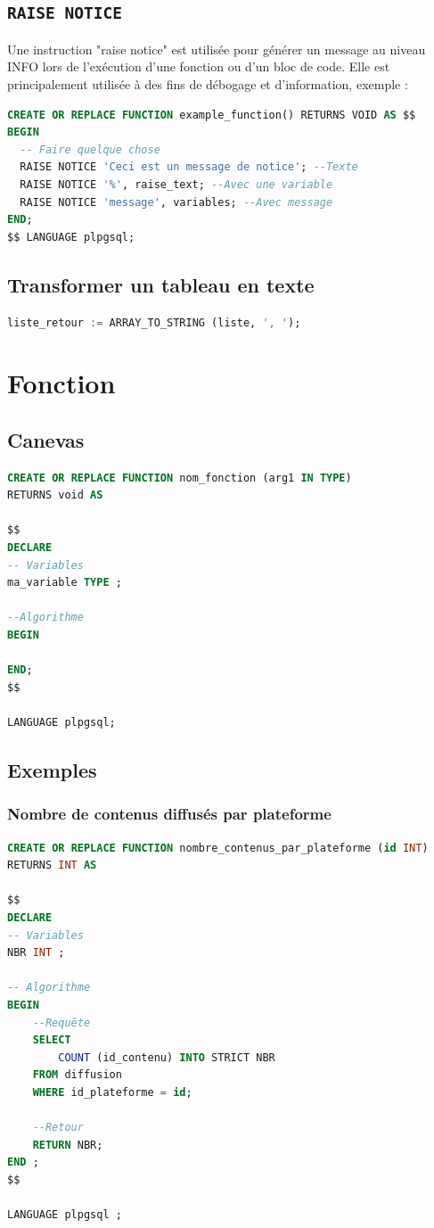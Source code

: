 \subsection{\texttt{RAISE NOTICE}}
Une instruction "raise notice" est utilisée pour générer un message au niveau INFO lors de l'exécution d'une fonction ou d'un bloc de code. Elle est principalement utilisée à des fins de débogage et d'information, exemple :
\begin{lstlisting}[language=SQL]
CREATE OR REPLACE FUNCTION example_function() RETURNS VOID AS $$
BEGIN
  -- Faire quelque chose
  RAISE NOTICE 'Ceci est un message de notice'; --Texte
  RAISE NOTICE '%', raise_text; --Avec une variable
  RAISE NOTICE 'message', variables; --Avec message
END;
$$ LANGUAGE plpgsql;
\end{lstlisting}

\subsection{Transformer un tableau en texte}
\begin{lstlisting}[language=SQL]
liste_retour := ARRAY_TO_STRING (liste, ', ');
\end{lstlisting}

\section{Fonction}

\subsection{Canevas}
\begin{lstlisting}[language=SQL]
CREATE OR REPLACE FUNCTION nom_fonction (arg1 IN TYPE)
RETURNS void AS

$$
DECLARE
-- Variables
ma_variable TYPE ;

--Algorithme
BEGIN

END;
$$

LANGUAGE plpgsql;
\end{lstlisting}

\subsection{Exemples}

\subsubsection{Nombre de contenus diffusés par plateforme}
\begin{lstlisting}[language=SQL]
CREATE OR REPLACE FUNCTION nombre_contenus_par_plateforme (id INT)
RETURNS INT AS

$$
DECLARE
-- Variables
NBR INT ;

-- Algorithme
BEGIN
	--Requête
	SELECT
		COUNT (id_contenu) INTO STRICT NBR
	FROM diffusion
	WHERE id_plateforme = id;
	
	--Retour
	RETURN NBR;
END ;
$$

LANGUAGE plpgsql ;
\end{lstlisting}

